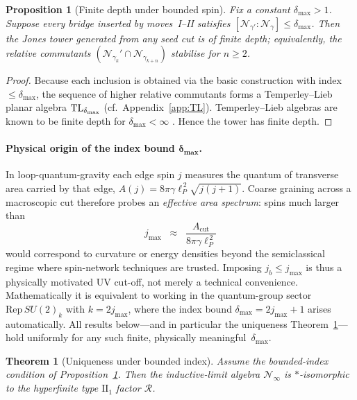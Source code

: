 \documentclass[11pt]{article}
\newtheorem{theorem}{Theorem}[section]
\newtheorem{proposition}{Proposition}[section]
\begin{document}
\begin{proposition}[Finite depth under bounded spin]\label{prop:finitedepth}
  Fix a constant $\delta_{\max}\!>\!1$.
  Suppose every bridge inserted by moves~I–II satisfies
  $[\mathcal N_{\gamma'}:\mathcal N_{\gamma}]\le \delta_{\max}$.
  Then the Jones tower generated from any seed cut is of finite depth;
  equivalently, the relative commutants
  $(\mathcal N_{\gamma_k}'\!\cap\mathcal N_{\gamma_{k+n}})$ stabilise for $n\ge 2$.
\end{proposition}

\begin{proof}
  Because each inclusion is obtained via the basic construction with
  index $\le\delta_{\max}$, the sequence of higher relative commutants
  forms a Temperley--Lieb planar algebra ${\rm TL}_{\delta_{\max}}$
  (cf.\ Appendix~\ref{app:TL}).
  Temperley--Lieb algebras are known to be finite depth for
  $\delta_{\max}\!<\!\infty$ \cite[Prop.~2.2]{JonesTL}.  Hence the tower
  has finite depth.
\end{proof}

\paragraph{Physical origin of the index bound $\boldsymbol{\delta_{\max}}$.}
In loop-quantum-gravity each edge spin \(j\) measures the quantum of
transverse area carried by that edge,
\(A(j)=8\pi\gamma \ell_{\!P}^{\,2}\sqrt{j(j+1)}\).
Coarse graining across a macroscopic cut therefore probes an \emph{effective
area spectrum}: spins much larger than
\[
  j_{\mathrm{max}}
  \;\;\approx\;\;
  \frac{A_{\mathrm{cut}}}{8\pi\gamma\ell_{\!P}^{\,2}}
\]
would correspond to curvature or energy densities beyond the
semiclassical regime where spin-network techniques are trusted.
Imposing \(j_b\le j_{\mathrm{max}}\) is thus a physically motivated UV
cut-off, not merely a technical convenience.  Mathematically it is
equivalent to working in the quantum-group sector
\(\mathrm{Rep}\,SU(2)_k\) with
\(k=2 j_{\mathrm{max}}\), where the index bound
\(\delta_{\max}=2j_{\mathrm{max}}+1\) arises automatically.  All results
below—and in particular the uniqueness
Theorem~\ref{thm:unique}—hold uniformly for any such finite, physically
meaningful~\(\delta_{\max}\).

\begin{theorem}[Uniqueness under bounded index]\label{thm:unique}
  Assume the bounded-index condition of Proposition~\ref{prop:finitedepth}.
  Then the inductive-limit algebra $\mathcal N_{\infty}$ is
  $*$-isomorphic to the hyperfinite type $\mathrm{II}_1$ factor
  $\mathcal R$.
\end{theorem}
\end{document}
